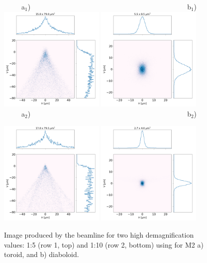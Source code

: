 \documentclass{iucr}              %
\begin{document}
\begin{figure}\label{fig:demagnification}
\flushleft
~~~~~a$_1$)~~~~~~~~~~~~~~~~~~~~~~~~~~~~~~~~~~~~~~~~~~~~~b$_1$) \\
\centering
\includegraphics[width=0.45\textwidth]{figures/M0p2_toroid.png}
\includegraphics[width=0.45\textwidth]{figures/M0p2_diaboloid.png} \\

\flushleft
~~~~~a$_2$)~~~~~~~~~~~~~~~~~~~~~~~~~~~~~~~~~~~~~~~~~~~~~b$_2$) \\
\centering

\includegraphics[width=0.45\textwidth]{figures/M0p1_toroid.png}
\includegraphics[width=0.45\textwidth]{figures/M0p1_diaboloid.png}
\caption{
Image produced by the beamline for two high demagnification values: 1:5 (row 1, top) and 1:10 (row 2, bottom) using for M2 a) toroid, and b) diaboloid.}
\end{figure}
\end{document}
